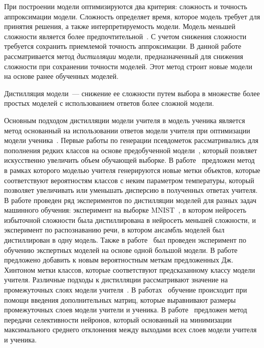 \documentclass[12pt]{a&t}
\begin{document}
При построении модели оптимизируются два критерия: сложность и точность аппроксимации модели. Сложность определяет время, которое модель требует для принятия решения, а также интерпретируемость модели. Модель меньшей сложности является более предпочтительной~\cite{bachteev2018}. С учетом снижения сложности требуется сохранить приемлемой точность аппроксимации. В данной работе рассматривается метод \textit{дистилляции} модели, предназначенный для снижения сложности при сохранении точности моделей. Этот метод строит новые модели на основе ранее обученных моделей.

\begin{definition}
Дистилляция модели~--- снижение ее сложности путем выбора в множестве более простых моделей с использованием ответов более сложной модели.
\end{definition}

Основным подходом дистилляции модели учителя в модель ученика является метод основанный на использовании ответов модели учителя при оптимизации модели ученика~\cite{Hinton2015, Bucilu2006, Lopez2016, Tang2016, Tzeng2015, Ahn2019}. Первые работы по генерации псевдометок рассматривались для пополнения редких классов на основе предобученной модели~\cite{Bucilu2006}, который позвляет искусственно увеличить объем обучающей выборке. В работе~\cite{Hinton2015} предложен метод в рамках которого моделью учителя генерируются новые метки объектов, которые соответствуют вероятностям классов с неким параметром температуры, который позволяет увеличивать или уменьшать дисперсию в полученных ответах учителя. В работе проведен ряд экспериментов по дистилляции моделей для разных задач машинного обучения: эксперимент на выборке MNIST~\cite{mnist}, в котором нейросеть избыточной сложности была дистиллирована в нейросеть меньшей сложности, и эксперимент по распознаванию речи, в котором ансамбль моделей был {дистиллирован} в одну модель. Также в работе~\cite{Hinton2015} был проведен эксперимент по обучению экспертных моделей на основе одной большой модели. В работе~\cite{Tang2016} предложено добавить к новым вероятностным меткам предложенных Дж. Хинтоном метки классов, которые соответствуют предсказанному классу модели учителя.
Различные подходы к дистилляции рассматривают значение на промежуточных слоях модели учителя~\cite{Ziqing2020, Zehao2017, Wang2020}. В работах~\cite{Ziqing2020, Wang2020} обучение происходит при помощи введения дополнительных матриц, которые выравнивают размеры промежуточных слоев модели учители и ученика. В работе~\cite{Zehao2017} предложен метод передачи селективности нейронов, который основанный на минимизации максимального среднего отклонения между выходами всех слоев модели учителя и ученика.
\end{document}

